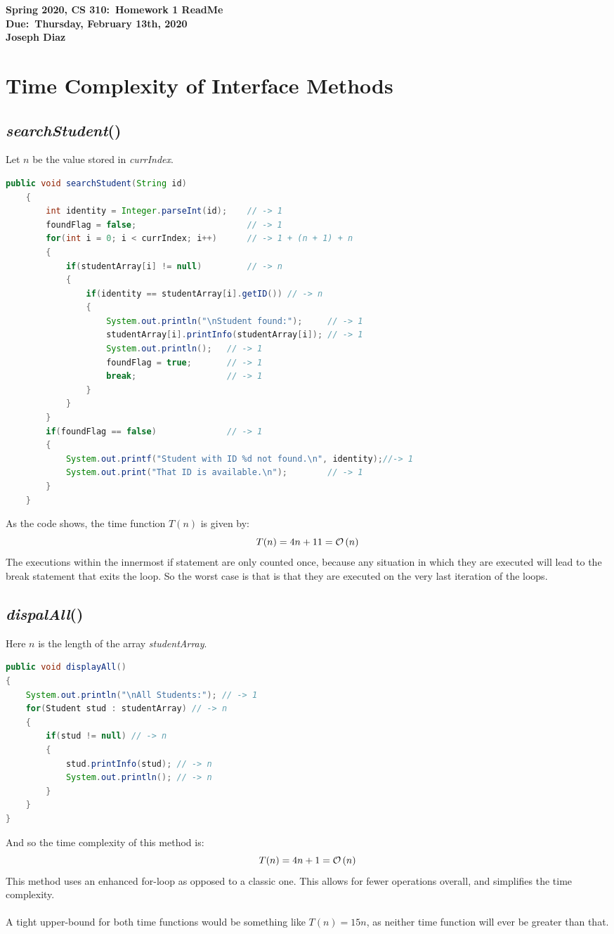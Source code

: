 \documentclass{article}
\newcommand{\BigO}[1]{\ensuremath\mathcal{O}\left(#1\right)}
\begin{document}
	\begin{large}
	\begin{center}
		\textbf{Spring 2020, CS 310:\ Homework 1 ReadMe} \\
		\textbf{Due:\ Thursday, February 13th, 2020} \\
		\textbf{Joseph Diaz}
	\end{center}
	\noindent\makebox[\linewidth]{\rule{\paperwidth}{0.4pt}}
\section*{Time Complexity of Interface Methods}
\subsection*{\textit{searchStudent}()}
	Let $n$ be the value stored in \textit{currIndex}.
	\begin{lstlisting}[language=Java, caption=\textit{searchStudent}()]
	public void searchStudent(String id)
	{
		int identity = Integer.parseInt(id); 	// -> 1
		foundFlag = false;						// -> 1
		for(int i = 0; i < currIndex; i++)		// -> 1 + (n + 1) + n
		{
			if(studentArray[i] != null)			// -> n
			{
				if(identity == studentArray[i].getID())	// -> n
				{
					System.out.println("\nStudent found:"); 	// -> 1
					studentArray[i].printInfo(studentArray[i]);	// -> 1
					System.out.println(); 	// -> 1
					foundFlag = true;		// -> 1
					break;					// -> 1
				}
			}
		}
		if(foundFlag == false)				// -> 1
		{
			System.out.printf("Student with ID %d not found.\n", identity);//-> 1
			System.out.print("That ID is available.\n");		// -> 1
		}
	}
\end{lstlisting}
As the code shows, the time function $T(n)$ is given by:
$$T(n) = 4n + 11 = \BigO{n}$$
The executions within the innermost if statement are only counted once, because any situation in which they are executed will lead to the break statement that exits the loop. So the worst case is that is that they are executed on the very last iteration of the loops.
\pagebreak
\subsection*{\textit{dispalAll}()}
Here $n$ is the length of the array \textit{studentArray}.
\begin{lstlisting}[language=Java, caption=\textit{displayAll}()]
public void displayAll()
{
	System.out.println("\nAll Students:"); // -> 1
	for(Student stud : studentArray) // -> n
	{
		if(stud != null) // -> n
		{
			stud.printInfo(stud); // -> n
			System.out.println(); // -> n
		}
	}
}
\end{lstlisting}	
	And so the time complexity of this method is:
	$$T(n) = 4n + 1 = \BigO{n}$$
	This method uses an enhanced for-loop as opposed to a classic one. This allows for fewer operations overall, and simplifies the time complexity.	\\\\
	A tight upper-bound for both time functions would be something like $T(n) = 15n$, as neither time function will ever be greater than that.\\
\noindent\makebox[\linewidth]{\rule{\paperwidth}{0.4pt}}

\end{large}
\end{document}
